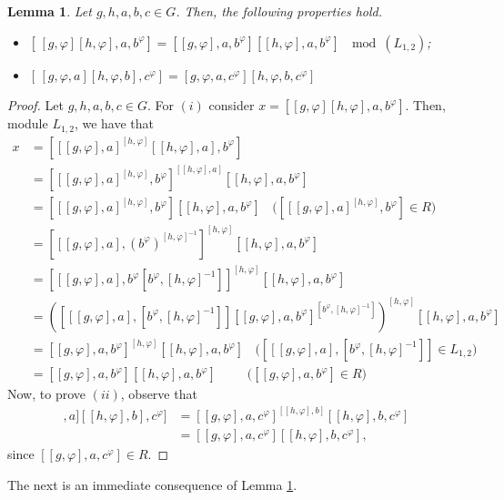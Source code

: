 \documentclass[12pt,leqno]{amsart}
\newtheorem{lem}[theorem]{\sc Lemma}
\begin{document}
\begin{lem}\label{Lm:R} Let $g,h,a,b,c\in G$. Then, the following properties hold.
\begin{itemize}
    \item[(i)]$
 [\, [g,\varphi] [h,\varphi],a,b^{\varphi}]=[[g,\varphi] ,a,b^{\varphi}][ [h,\varphi],a,b^{\varphi}] \ \mod(L_{1,2})
$;
\item[(ii)] $ [\,[g,\varphi,a] [ h,\varphi,b] ,c^{\varphi}]=[g,\varphi,a ,c^{\varphi}][ h,\varphi,b ,c^{\varphi}]$
\end{itemize}
    
\end{lem}
\begin{proof}
{Let $g,h,a,b,c\in G$. For $(i)$ consider $x=[[g,\varphi] [h,\varphi],a,b^{\varphi}]$. Then, module $L_{1,2}$, we have that
\begin{align*}
    x&=[[[g,\varphi],a]^{[h,\varphi]}[[h,\varphi],a],b^{\varphi}]\\
    &=[[[g,\varphi],a]^{[h,\varphi]},b^{\varphi}]^{[[h,\varphi],a]}[[h,\varphi],a,b^{\varphi}]\\
    &=[[[g,\varphi],a]^{[h,\varphi]},b^{\varphi}][[h,\varphi],a,b^{\varphi}] \ \ \ \ \big( [[[g,\varphi],a]^{[h,\varphi]},b^{\varphi}]\in R \big)\\
    &= [[[g,\varphi],a],(b^{\varphi})^{[h,\varphi]^{-1}}]^{[h,\varphi]}[[h,\varphi],a,b^{\varphi}]\\
    &=[[[g,\varphi],a],b^{\varphi}[b^{\varphi},{[h,\varphi]^{-1}}]]^{[h,\varphi]}[[h,\varphi],a,b^{\varphi}]\\
    &=\left([[[g,\varphi],a],[b^{\varphi},{[h,\varphi]^{-1}}]][[g,\varphi],a,b^{\varphi}]^{[b^{\varphi},{[h,\varphi]^{-1}}]}\right)^{[h,\varphi]}[[h,\varphi],a,b^{\varphi}]\\
    &=[[g,\varphi],a,b^{\varphi}]^{[h,\varphi]}[[h,\varphi],a,b^{\varphi}] \ \ \ \ \big([[[g,\varphi],a],[b^{\varphi},{[h,\varphi]^{-1}}]]\in L_{1,2}\big)\\
    &=[[g,\varphi],a,b^{\varphi}][[h,\varphi],a,b^{\varphi}] \ \ \ \ \ \ \ \ \ 
    \ \ \big([[g,\varphi],a,b^{\varphi}]\in R\big)
\end{align*}
Now, to prove $(ii)$, observe that 
\begin{align*}
    [[[g,\varphi],a] [ [h,\varphi],b] ,c^{\varphi}]&=[[g,\varphi],a ,c^{\varphi}]^{[ [h,\varphi],b]}[ [h,\varphi],b, c^{\varphi}]\\
    &=[[g,\varphi],a ,c^{\varphi}][ [h,\varphi],b ,c^{\varphi}],
\end{align*}
since $ [[g,\varphi],a ,c^{\varphi}]\in R$.}
\end{proof}
The next is an immediate consequence of Lemma \ref{Lm:R}.  
\end{document}
